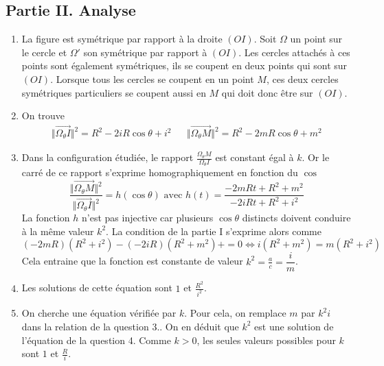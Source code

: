 \subsection*{Partie II. Analyse}
\begin{enumerate}
 \item La figure est symétrique par rapport à la droite $(OI)$. Soit $\Omega$ un point sur le cercle et $\Omega'$ son symétrique par rapport à $(OI)$. Les cercles attachés à ces points sont également symétriques, ils se coupent en deux points qui sont sur $(OI)$. Lorsque tous les cercles se coupent en un point $M$, ces deux cercles symétriques particuliers se coupent aussi en $M$ qui doit donc être sur $(OI)$.
 \item On trouve
\begin{align*}
 \Vert \overrightarrow{\Omega_\theta I}\Vert^2 = R^2 -2iR\cos \theta + i^2 
& &
 \Vert \overrightarrow{\Omega_\theta M}\Vert^2 = R^2 -2mR\cos \theta + m^2 
\end{align*}

 \item Dans la configuration étudiée, le rapport $\frac{\Omega_\theta M}{\Omega_\theta I}$ est constant égal à $k$. Or le carré de ce rapport s'exprime homographiquement en fonction du $\cos$
\begin{displaymath}
 \frac{\Vert \overrightarrow{\Omega_\theta M}\Vert^2}{\Vert \overrightarrow{\Omega_\theta I}\Vert^2} = h(\cos \theta)
\text{ avec }
h(t)=\frac{-2mRt+R^2+m^2}{-2iRt+R^2+i^2}
\end{displaymath}
La fonction $h$ n'est pas injective car plusieurs $\cos \theta$ distincts doivent conduire à la même valeur $k^2$. La condition de la partie I s'exprime alors comme
\begin{displaymath}
 (-2mR)(R^2+i^2)-(-2iR)(R^2+m^2)+=0\Leftrightarrow i(R^2+m^2)=m(R^2+i^2)
\end{displaymath}
Cela entraine que la fonction est constante de valeur $k^2=\frac{a}{c}=\dfrac{i}{m}$.
 \item Les solutions de cette équation sont $1$ et $\frac{R^2}{i^2}$.
 \item On cherche une équation vérifiée par $k$. Pour cela, on remplace $m$ par $k^2i$ dans la relation de la question 3.. On en déduit que $k^2$ est une solution de l'équation de la question 4. Comme $k>0$, les seules valeurs possibles pour $k$ sont $1$ et $\frac{R}{i}$.  
\end{enumerate}
